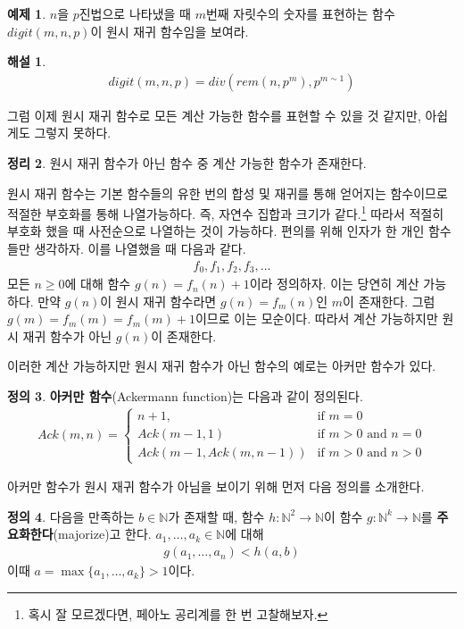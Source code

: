 \documentclass[b5paper, 11pt]{book}
\theoremstyle{definition}
\newtheorem{defn}{정의}[chapter]
\newtheorem{thm}[defn]{정리}
\newtheorem{ex}[defn]{예제}
\newtheorem*{ans*}{해설}
\newenvironment{pf*}{\pushQED{\qed}\pf}
{\popQED\endpf}
\begin{document}
\begin{ex}
    $n$을 $p$진법으로 나타냈을 때 $m$번째 자릿수의 숫자를 표현하는 함수 $digit(m,n,p)$이 원시 재귀 함수임을 보여라.
\end{ex}
\begin{ans*}
    \begin{align*}
        digit(m,n,p) = div(rem(n,p^m), p^{m \sim 1})
    \end{align*}
\end{ans*}
그럼 이제 원시 재귀 함수로 모든 계산 가능한 함수를 표현할 수 있을 것 같지만, 아쉽게도 그렇지 못하다.
\begin{thm}\label{prc nc}
    원시 재귀 함수가 아닌 함수 중 계산 가능한 함수가 존재한다.
\end{thm} 
\begin{pf*}
원시 재귀 함수는 기본 함수들의 유한 번의 합성 및 재귀를 통해 얻어지는 함수이므로 적절한 부호화를 통해 나열가능하다. 즉, 자연수 집합과 크기가 같다.\footnote{혹시 잘 모르겠다면, 페아노 공리계를 한 번 고찰해보자.} 따라서 적절히 부호화 했을 때 사전순으로 나열하는 것이 가능하다. 편의를 위해 인자가 한 개인 함수들만 생각하자. 이를 나열했을 때 다음과 같다.
\begin{align*}
    f_0, f_1, f_2, f_3, \ldots 
\end{align*}
모든 $n \ge 0$에 대해 함수 $g(n) = f_n (n) +  1$이라 정의하자. 이는 당연히 계산 가능하다. 만약 $g(n)$이 원시 재귀 함수라면 $g(n) = f_m(n)$인 $m$이 존재한다. 그럼 $g(m) = f_m(m) = f_m(m) + 1$이므로 이는 모순이다. 따라서 계산 가능하지만 원시 재귀 함수가 아닌 $g(n)$이 존재한다. 
\end{pf*}
이러한 계산 가능하지만 원시 재귀 함수가 아닌 함수의 예로는 아커만 함수가 있다.
\begin{defn}
    \textbf{아커만 함수}(Ackermann function)는 다음과 같이 정의된다. 
    \begin{align*}
        Ack(m,n) = \begin{cases}
            n+1, & \text{if } m = 0 \\ 
            Ack(m-1, 1) & \text{if } m > 0 \text{ and } n = 0 \\ 
            Ack(m-1, Ack(m, n-1)) & \text{if } m>0 \text{ and } n > 0 
        \end{cases} 
    \end{align*}
\end{defn}
아커만 함수가 원시 재귀 함수가 아님을 보이기 위해 먼저 다음 정의를 소개한다.
\begin{defn}
    다음을 만족하는 $b\in \mathbb{N}$가 존재할 때, 함수 $h:\mathbb{N}^2 \rightarrow \mathbb{N}$이 함수 $g:\mathbb{N}^k\rightarrow \mathbb{N}$를 \textbf{주요화한다}(majorize)고 한다. $a_1, \ldots, a_k \in \mathbb{N}$에 대해
    \begin{align*}
        g(a_1, \ldots, a_n) < h(a, b)
    \end{align*}
    이때 $a = \max{\{a_1, \ldots, a_k\}} > 1$이다. 
\end{defn} 
\end{document}
